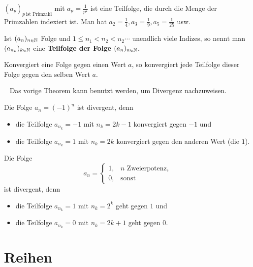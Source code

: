 \begin{bsp}
	$(a_p)_{p \ \text{ist Primzahl}}$ mit $a_p = \frac{1}{p^2}$ ist eine Teilfolge, die durch die Menge der Primzahlen indexiert ist. Man hat $a_2 = \frac{1}{4}, a_3 = \frac{1}{9}, a_5 = \frac{1}{25}$ usw. 
\end{bsp} 

\begin{defn} 
	Ist $(a_n)_{n \in \mathbb{N}}$ Folge und $1 \le n_1 < n_2 < n_2 \cdots $ unendlich viele Indizes, so nennt man $(a_{n_k})_{k \in \mathbb{N}}$ eine \textbf{Teilfolge der Folge} $(a_n)_{n \in \mathbb{N}}$. 
\end{defn} 


\begin{thm}
	Konvergiert eine Folge gegen einen Wert $a$, so konvergiert jede Teilfolge dieser Folge gegen den selben Wert $a$. 
\end{thm} 

\begin{bsp} {\ } Das vorige Theorem kann benutzt werden, um Divergenz nachzuweisen. 
	\begin{enuma} 
		\item Die Folge $a_n = (-1)^n$ ist divergent, denn 
		\begin{itemize} 
			\item[] die Teilfolge  $a_{n_k} = -1$ mit $n_k = 2k-1$ konvergiert gegen $-1$ und 
			\item[] die Teilfolge $a_{n_k} = 1$ mit $n_k = 2k$ konvergiert gegen den anderen Wert (die $1$). 
		\end{itemize} 
		\item Die Folge 
		\[
			a_n = \begin{cases} 
				1, & \text{$n$ Zweierpotenz},
				\\ 0, & \text{sonst}
			\end{cases} 
		\]
		ist divergent, denn 
		\begin{itemize} 
			\item[] die Teilfolge $a_{n_k} = 1$ mit $n_k = 2^k$ geht gegen $1$ und 
			\item[] die Teilfolge $a_{n_k} = 0$ mit $n_k = 2 k +1$ geht gegen $0$. 
		\end{itemize} 
	\end{enuma} 
\end{bsp} 

\section{Reihen} 

